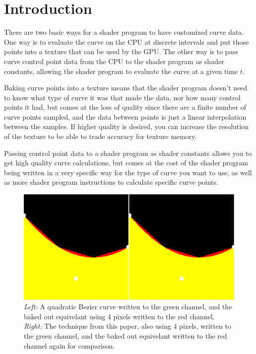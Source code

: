 \documentclass{jcgt}
\begin{document}
\section{Introduction}
\label{sec:introduction}
There are two basic ways for a shader program to have customized curve data.  One way is to evaluate the curve on the CPU at discrete intervals and put those points into a texture that can be used by the GPU.  The other way is to pass curve control point data from the CPU to the shader program as shader constants, allowing the shader program to evaluate the curve at a given time $t$.

Baking curve points into a texture means that the shader program doesn't need to know what type of curve it was that made the data, nor how many control points it had, but comes at the loss of quality since there are a finite number of curve points sampled, and the data between points is just a linear interpolation between the samples.  If higher quality is desired, you can increase the resolution of the texture to be able to trade accuracy for texture memory.

Passing control point data to a shader program as shader constants allows you to get high quality curve calculations, but comes at the cost of the shader program being written in a very specific way for the type of curve you want to use, as well as more shader program instructions to calculate specific curve points.

\begin{figure}
  \includegraphics[width=5in]{Figure2.png}
  \caption{\textit{Left:} A quadratic Bezier curve written to the green channel, and the baked out equivelant using 4 pixels written to the red channel.  \textit{Right:} The technique from this paper, also using 4 pixels, written to the green channel, and the baked out equivelant written to the red channel again for comparison.}
  \label{fig:quickcomparison}
\end{figure}
\end{document}
